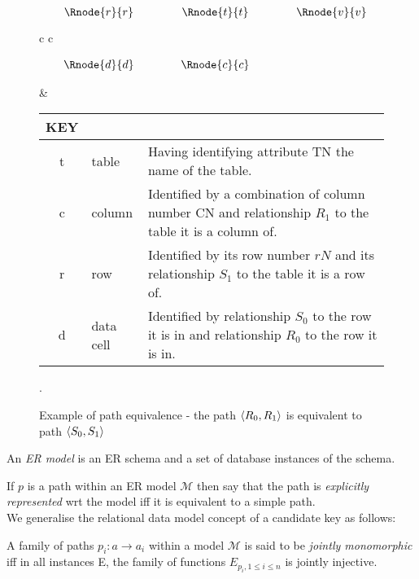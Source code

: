 \documentclass[10pt,a4paper]{article}
\newcommand{\term}[1]{\textit{{#1}}}
\newcommand{\genericmodel}{\mathcal{M}}
\begin{document}
\begin{figure} [H]
\begin{center}
\begin{tabular}{c c}
$
\begin{array}{cp{0.75cm}cp{0.75cm}c}
   \Rnode{r}{r}     & & \Rnode{t}{t} & & \Rnode{v}{v} \\[1.2cm]     
	 \Rnode{d}{d}   & & \Rnode{c}{c} & &               
\end{array}
$
\idcomp
{} 
\idcomp
{} 
\idcomp
{}
\idcomp
{}
\idcomp
{}
\idcomp
{}
\idcomp

& \footnotesize
\begin{tabular}{c p{1.5cm} p{4cm}}
KEY && \\
\hline
t & table & Having identifying attribute TN the name of the table. \\
c & column & Identified by a combination of column number CN and relationship $R_1$ to the table it is a column of.\\
r & row & Identified by its row number $rN$ and its relationship $S_1$ to the table it is a row of.\\
d & data cell & Identified by relationship $S_0$ to the row it is in and relationship $R_0$ to the row it is in. \\
\end{tabular} 
\end{tabular}
\end{center}
\caption{Example of path equivalence - the path $\langle R_0,R_1\rangle$ is equivalent to path $\langle S_0,S_1\rangle$}.
\label{datatablegraph}
\end{figure}

\begin{definition}
\noindent An \term{ER model} is an ER schema and a set of database instances of the schema. \\
\end{definition}

\noindent If $p$ is a path within an ER model $\genericmodel$ then say that the path is \term{explicitly represented} wrt the model iff it is equivalent to a simple path. \\

\noindent We generalise the relational data model concept of a candidate key as follows:

\begin{definition}
A family of paths $p_i: a \rightarrow a_i$ within a model $\genericmodel$ is said to be \term{jointly monomorphic} iff in all instances E,
the family of functions 
$E_{p_i, 1 \leq i \leq n}$  is jointly injective. 
\end{definition}
\end{document}
